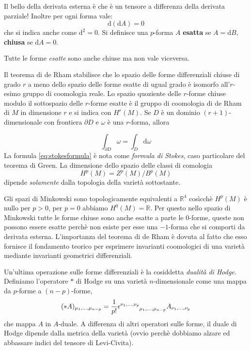 \documentclass[twoside]{article}
\begin{document}
Il bello della derivata esterna è che è un tensore a differenza della derivata parziale! Inoltre per ogni forma vale:
\begin{equation}
	\textrm{d}(\textrm{d}A)=0
\end{equation}
che si indica anche come $\textrm{d}^2=0$. Si definisce una $p$-forma $A$ \textbf{esatta} se $A=\textrm{d}B$, \textbf{chiusa} se $\textrm{d}A=0$. 

Tutte le forme \emph{esatte} sono anche chiuse ma non vale viceversa. 

Il teorema di de Rham stabilisce che lo spazio delle forme differenziali chiuse di grado $r$ a meno dello spazio delle forme esatte di ugual grado è isomorfo all'$r$-esimo gruppo di coomologia reale.
Lo spazio quoziente delle $r$-forme chiuse modulo il sottospazio delle $r$-forme esatte è il gruppo di coomologia di de Rham di $M$ in dimensione $r$ e si indica con $H^r(M)$. Se $D$ è un dominio $(r+1)$-dimensionale con frontiera $\partial D$ e $\omega$ è una $r$-forma, allora 

\begin{equation}\label{eq:stokesformula}
 \int_{\partial D} \omega = \int_{D} \textrm{d}\omega
\end{equation}
La formula \ref{eq:stokesformula} è nota come \emph{formula di Stokes}, caso particolare del teorema di Green.
La dimensione dello spazio delle classi di comologia $$H^p(M)=Z^p(M)/B^p(M)$$ dipende \emph{solamente} dalla topologia della varietà sottostante.

Gli spazi di Minkowski sono topologicamente equivalenti a $\mathbb{R}^4$ cosìcchè $H^p(M)$ è nullo per $p>0$, per $p=0$ abbiamo $H^0(M)=\mathbb{R}$. Per questo nello spazio di Minkowski tutte le forme chiuse sono anche esatte a parte le $0$-forme, queste non possono essere esatte perchè non esiste per esse una $-1$-forma che si comporti da derivata esterna.
L'importanza del teorema di de Rham è dovuta al fatto che esso fornisce il fondamento teorico per esprimere invarianti coomologici di una varietà mediante invarianti geometrici differenziali.

Un'ultima operazione sulle forme differenziali è la cosiddetta \emph{dualità di Hodge}. Definiamo l'operatore $*$ di Hodge su una varietà $n$-dimensionale come una mappa da $p$-forme a $(n-p)$-forme,
\begin{equation}\label{eq:hodgedualitystar}
(*A)_{\mu_1,\ldots,\mu_{n-p}} = \frac{1}{p!}\epsilon\indices{^{\nu_1,\ldots,\nu_p}_{\mu_1,\ldots,\mu_{n-p}}}A_{\nu_1,\ldots,\nu_p}
\end{equation}
che mappa $A$ in $A$-duale. A differenza di altri operatori sulle forme, il duale di Hodge dipende dalla metrica della varietà (ovvio perchè dobbiamo alzare ed abbassare indici del tensore di Levi-Civita).
\end{document}
